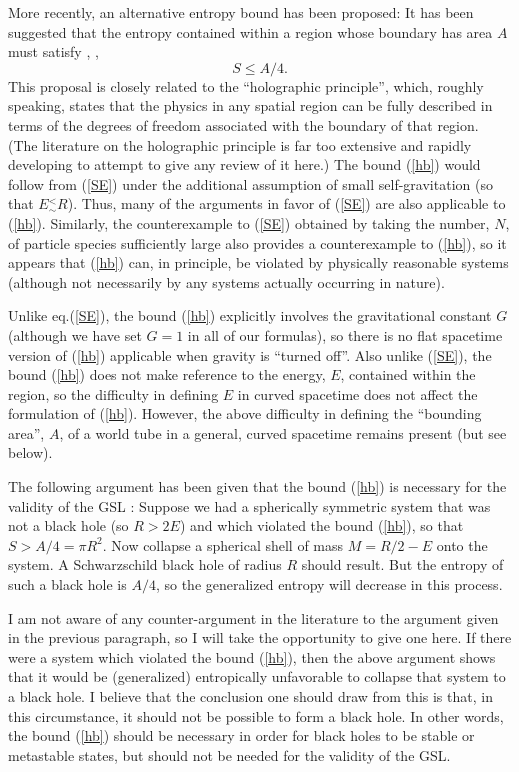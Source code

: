 More recently, an alternative entropy bound has been proposed: It has
been suggested that the entropy contained within a region whose
boundary has area $A$ must satisfy \cite{th1}, \cite{b8}, \cite{suss}
\begin{equation}
S \leq A/4 .
\label{hb}
\end{equation}
This proposal is closely related to the ``holographic principle'',
which, roughly speaking, states that the physics in any spatial region
can be fully described in terms of the degrees of freedom associated
with the boundary of that region. (The literature on the holographic
principle is far too extensive and rapidly developing to attempt to
give any review of it here.) The bound (\ref{hb}) would follow from
(\ref{SE}) under the additional assumption of small self-gravitation
(so that $E \mathrel{{}^<_\sim} R$). Thus, many of the arguments in
favor of (\ref{SE}) are also applicable to (\ref{hb}). Similarly, the
counterexample to (\ref{SE}) obtained by taking the number, $N$, of
particle species sufficiently large also provides a counterexample to
(\ref{hb}), so it appears that (\ref{hb}) can, in principle, be
violated by physically reasonable systems (although not necessarily by
any systems actually occurring in nature).

Unlike eq.(\ref{SE}), the bound (\ref{hb}) explicitly involves the
gravitational constant $G$ (although we have set $G = 1$ in all of our
formulas), so there is no flat spacetime version of (\ref{hb})
applicable when gravity is ``turned off''. Also unlike (\ref{SE}), the
bound (\ref{hb}) does not make reference to the energy, $E$, contained
within the region, so the difficulty in defining $E$ in curved
spacetime does not affect the formulation of (\ref{hb}). However, the
above difficulty in defining the ``bounding area'', $A$, of a world
tube in a general, curved spacetime remains present (but see below).

The following argument has been given that the bound (\ref{hb}) is
necessary for the validity of the GSL \cite{suss}: Suppose we had a
spherically symmetric system that was not a black hole (so $R > 2 E$)
and which violated the bound (\ref{hb}), so that $S > A/4 = \pi R^2$. Now
collapse a spherical shell of mass $M = R/2 - E$ onto the system. A
Schwarzschild black hole of radius $R$ should result. But the entropy
of such a black hole is $A/4$, so the generalized entropy will
decrease in this process.

I am not aware of any counter-argument in the literature to the
argument given in the previous paragraph, so I will take the
opportunity to give one here. If there were a system which violated
the bound (\ref{hb}), then the above argument shows that it would be
(generalized) entropically unfavorable to collapse that system to a
black hole. I believe that the conclusion one should draw
from this is that, in this circumstance, it should not be possible to
form a black hole. In other words, the bound (\ref{hb}) should be
necessary in order for black holes to be stable or metastable states,
but should not be needed for the validity of the GSL.


